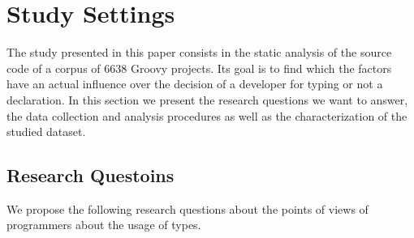 \documentclass[preprint]{sigplanconf}
\begin{document}
%
%

\section{Study Settings\label{settings}}
The study presented in this paper consists in the static analysis of the source code of a corpus of 6638 Groovy projects.
Its goal is to find which the factors have an actual influence over the decision of a developer for typing or not a declaration. 
In this section we present the research questions we want to answer, the data collection and analysis procedures as well as the characterization of the studied dataset.

\subsection{Research Questoins\label{questions}}
We propose the following research questions about the points of views of programmers about the usage of types.
\end{document}
